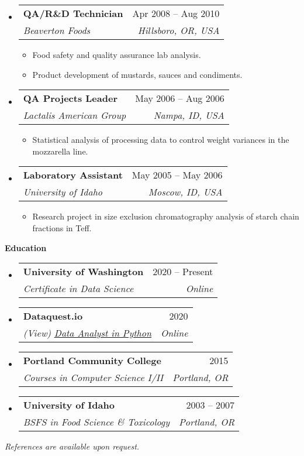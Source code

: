 \documentclass[letterpaper,12pt]{article}[leftmargin=*]
\makeatletter
\def \entryspacing {-0pt}
\newcommand{\education}[2]{\vspace{6pt}
  \colorbox{Copper}{\color{white}\raggedbottom\normalsize\textbf{{#1}{\hspace{9pt}#2\hspace{4pt}}}}
}
\newcommand{\resumeEntryStart}{\begin{itemize}[leftmargin=2.5mm]}
\newcommand{\resumeEntryEnd}{\end{itemize}\vspace{\entryspacing}}
\newcommand{\resumeItemListStart}{\begin{itemize}[leftmargin=4.5mm]}
\newcommand{\resumeItemListEnd}{\end{itemize}}
\newcommand{\resumeItem}[1]{
  \item\small{
    {#1 \vspace{-2pt}}
  }
}
\newcommand{\resumeEntryTSDL}[4]{
  \vspace{-1pt}\item[]
    \begin{tabularx}{0.97\textwidth}{X@{\hspace{60pt}}r}
      \textbf{\color{primary}#1} & {\firabook\color{accent}\small#2} \\
      \textit{\color{accent}\small#3} & \textit{\color{accent}\small#4} \\
    \end{tabularx}\vspace{-6pt}
}
\makeatother
\begin{document}
  \resumeEntryStart
    \resumeEntryTSDL
      {QA/R\&D Technician}{Apr 2008 -- Aug 2010}
      {Beaverton Foods}{Hillsboro, OR, USA}
    \resumeItemListStart
      \resumeItem {Food safety and quality assurance lab analysis.}
      \resumeItem {Product development of mustards, sauces and condiments.}
    \resumeItemListEnd
  \resumeEntryEnd
  
  \resumeEntryStart
    \resumeEntryTSDL
      {QA Projects Leader}{May 2006 -- Aug 2006}
      {Lactalis American Group}{Nampa, ID, USA}
    \resumeItemListStart
      \resumeItem {Statistical analysis of processing data to control weight variances in the mozzarella line.}
    \resumeItemListEnd
  \resumeEntryEnd
  
  \resumeEntryStart
    \resumeEntryTSDL
      {Laboratory Assistant}{May 2005 -- May 2006}
      {University of Idaho}{Moscow, ID, USA}
    \resumeItemListStart
      \resumeItem {Research project in size exclusion chromatography analysis of starch chain fractions in Teff.}
    \resumeItemListEnd
  \resumeEntryEnd

\education{\faGraduationCap}{Education}

  \resumeEntryStart
    \resumeEntryTSDL
      {University of Washington}{2020 -- Present}
      {Certificate in Data Science}{Online}
    \resumeEntryTSDL
      {Dataquest.io}{2020}
      {(View) \href{https://app.dataquest.io/view_cert/G76HQZAT7X8UQNXKR3LR/}{\underline{Data Analyst in Python}}}{Online}
    \resumeEntryTSDL
      {Portland Community College}{2015}
      {Courses in Computer Science I/II}{Portland, OR}
    \resumeEntryTSDL
      {University of Idaho}{2003 -- 2007}
      {BSFS in Food Science \& Toxicology}{Portland, OR}
    
  \resumeEntryEnd
  
  \bigskip 
  
  \begin{center}
    \color{accent}\small{\textit{References are available upon request.}}
  \end{center}
\end{document}
